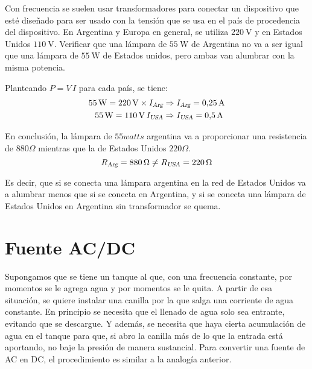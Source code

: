 \begin{mdframed}[style=ExampleFrame]
    \begin{example}
    \end{example}
    \begin{formatI}
        Con frecuencia se suelen usar transformadores para conectar un dispositivo que esté diseñado para ser usado con la tensión que se usa en el país de procedencia del dispositivo.
        En Argentina y Europa en general, se utiliza $\SI{220}{\volt}$ y en Estados Unidos $\SI{110}{\volt}$.
        Verificar que una lámpara de $\SI{55}{\watt}$ de Argentina no va a ser igual que una lámpara de $\SI{55}{\watt}$ de Estados unidos, pero ambas van alumbrar con la misma potencia.
    \end{formatI}
    
    Planteando $P = V \, I$ para cada país, se tiene:
    \begin{align*}
        \SI{55}{\watt} = \SI{220}{\volt} \times {{I}_\textsl{{Arg}}} & \Rightarrow {{I}_\textsl{{Arg}}} = \SI{0.25}{\ampere}
        \\
        \SI{55}{\watt} = \SI{110}{\volt} \, {{I}_\textsl{{USA}}} & \Rightarrow {{I}_\textsl{{USA}}} = \SI{0.5}{\ampere}
    \end{align*}
    
    En conclusión, la lámpara de $55 watts$ argentina va a proporcionar una resistencia de $880\Omega$ mientras que la de Estados Unidos $220\Omega$.
    \begin{equation*}
        \sub{R}{Arg} = \SI{880}{\ohm} \neq \sub{R}{USA} = \SI{220}{\ohm}
    \end{equation*}
    
    Es decir, que si se conecta una lámpara argentina en la red de Estados Unidos va a alumbrar menos que si se conecta en Argentina, y si se conecta una lámpara de Estados Unidos en Argentina sin transformador se quema.
\end{mdframed}


\section{Fuente AC/DC}

Supongamos que se tiene un tanque al que, con una frecuencia constante, por momentos se le agrega agua y por momentos se le quita.
A partir de esa situación, se quiere instalar una canilla por la que salga una corriente de agua constante.
En principio se necesita que el llenado de agua solo sea entrante, evitando que se descargue.
Y además, se necesita que haya cierta acumulación de agua en el tanque para que, si abro la canilla más de lo que la entrada está aportando, no baje la presión de manera sustancial.
Para convertir una fuente de AC en DC, el procedimiento es similar a la analogía anterior.

